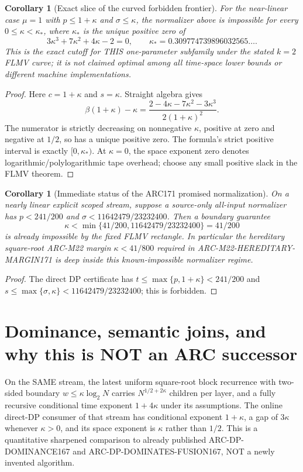 \documentclass[11pt]{article}
\newtheorem{corollary}[theorem]{Corollary}
\begin{document}
\begin{corollary}[Exact slice of the curved forbidden frontier]
For the near-linear case $\mu=1$ with $p\le1+\kappa$ and
$\sigma\le\kappa$, the normalizer above is impossible for every
$0\le\kappa<\kappa_*$, where $\kappa_*$ is the unique positive zero of
\[
\boxed{3\kappa^3+7\kappa^2+4\kappa-2=0,\qquad
\kappa_*=0.309774739896032565\ldots.}
\]
This is the exact cutoff for THIS one-parameter subfamily under the stated
$k=2$ FLMV curve; it is not claimed optimal among all time-space lower
bounds or different machine implementations.
\end{corollary}
\begin{proof}
Here $c=1+\kappa$ and $s=\kappa$. Straight algebra gives
\[
\beta(1+\kappa)-\kappa=
\frac{2-4\kappa-7\kappa^2-3\kappa^3}{2(1+\kappa)^2}.
\]
The numerator is strictly decreasing on nonnegative $\kappa$, positive at
zero and negative at $1/2$, so has a unique positive zero. The formula's
strict positive interval is exactly $[0,\kappa_*)$. At $\kappa=0$, the
space exponent zero denotes logarithmic/polylogarithmic tape overhead;
choose any small positive slack in the FLMV theorem.
\end{proof}

\begin{corollary}[Immediate status of the ARC171 promised normalization]\label{thm:margin}
On a nearly linear explicit scoped stream, suppose a \emph{source-only}
all-input normalizer has $p<241/200$ and
$\sigma<11642479/23232400$. Then a boundary guarantee
\[
\kappa<\min\{41/200,11642479/23232400\}=41/200
\]
is already impossible by the fixed FLMV rectangle.
In particular the hereditary square-root ARC-M22 margin
$\kappa<41/800$ required in ARC-M22-HEREDITARY-MARGIN171 is deep inside
this known-impossible normalizer regime.
\end{corollary}
\begin{proof}
The direct DP certificate has $t\le\max\{p,1+\kappa\}<241/200$
and $s\le\max\{\sigma,\kappa\}<11642479/23232400$; this is forbidden.
\end{proof}

\section{Dominance, semantic joins, and why this is NOT an ARC successor}
On the SAME stream, the latest uniform square-root block recurrence with
two-sided boundary $w\le\kappa\log_2N$ carries $N^{1/2+2\kappa}$
children per layer, and a fully recursive conditional time exponent
$1+4\kappa$ under its assumptions. The online direct-DP consumer of that
stream has conditional exponent $1+\kappa$, a gap of $3\kappa$ whenever
$\kappa>0$, and its space exponent is $\kappa$ rather than $1/2$. This
is a quantitative sharpened comparison to already published
ARC-DP-DOMINANCE167 and ARC-DP-DOMINATES-FUSION167, NOT a newly invented
algorithm.
\end{document}

